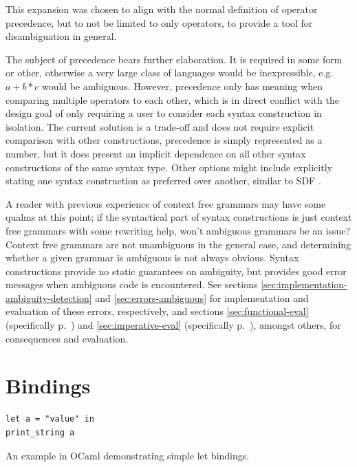 \documentclass{kththesis}
\begin{document}
This expansion was chosen to align with the normal definition of operator precedence, but to not be limited to only operators, to provide a tool for disambiguation in general.

The subject of precedence bears further elaboration. It is required in some form or other, otherwise a very large class of languages would be inexpressible, e.g. $a + b * c$ would be ambiguous. However, precedence only has meaning when comparing multiple operators to each other, which is in direct conflict with the design goal of only requiring a user to consider each syntax construction in isolation. The current solution is a trade-off and does not require explicit comparison with other constructions, precedence is simply represented as a number, but it does present an implicit dependence on all other syntax constructions of the same syntax type. Other options might include explicitly stating one syntax construction as preferred over another, similar to SDF \cite{Heering1989The-syntax-defi}.

A reader with previous experience of context free grammars may have some qualms at this point; if the syntactical part of syntax constructions is just context free grammars with some rewriting help, won't ambiguous grammars be an issue? Context free grammars are not unambiguous in the general case, and determining whether a given grammar is ambiguous is not always obvious. Syntax constructions provide no static guarantees on ambiguity, but provides good error messages when ambiguous code is encountered. See sections \ref{sec:implementation-ambiguity-detection} and \ref{sec:errors-ambiguous} for implementation and evaluation of these errors, respectively, and sections \ref{sec:functional-eval} (specifically p.~\pageref{sec:ambiguous-lists}) and \ref{sec:imperative-eval} (specifically p.~\pageref{sec:lua-func-call-precedence}), amongst others, for consequences and evaluation.

\section{Bindings} \label{sec:design-bindings}

\begin{listing}[t]
\begin{verbatim}
let a = "value" in
print_string a
\end{verbatim}
\caption{An example in OCaml demonstrating simple let bindings.}
\label{lst:nested-binding-example}
\end{listing}
\end{document}
